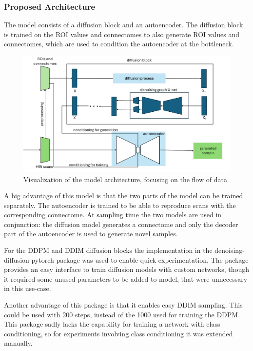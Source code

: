 	\subsubsection{Proposed Architecture}
	
	The model consists of a diffusion block and an autoencoder. The diffusion block is trained on the ROI values and connectomes to also generate ROI values and connectomes, which are used to condition the autoencoder at the bottleneck.
	
	\begin{figure}[!h]
		\centering
		\includegraphics[width=\textwidth]{figures/architecture.png}
		\caption{Visualization of the model architecture, focusing on the flow of data}
	\end{figure}
	
	A big advantage of this model is that the two parts of the model can be trained separately. The autoencoder is trained to be able to reproduce scans with the corresponding connectome. At sampling time  the two models are used in conjunction: the diffusion model generates a connectome and only the decoder part of the autoencoder is used to generate novel samples.
	
	For the DDPM and DDIM diffusion blocks the implementation in the denoising-diffusion-pytorch package was used to enable quick experimentation. The package provides an easy interface to train diffusion models with custom networks, though it required some unused parameters to be added to model, that were unnecessary in this use-case.
	
	Another advantage of this package is that it enables easy DDIM sampling. This could be used with 200 steps, instead of the 1000 used for training the DDPM. This package sadly lacks the capability for training a network with class conditioning, so for experiments involving class conditioning it was extended manually.
	
